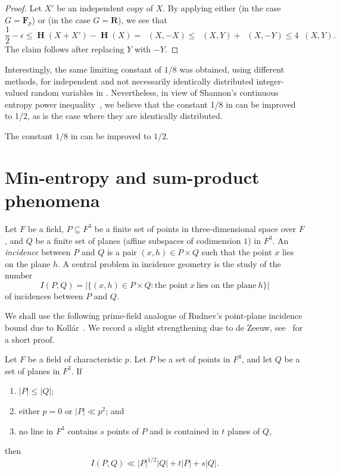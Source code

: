 \documentclass[twoside, 10pt]{article}
\newcommand\FF{{\mathbf{F}}}
\DeclareMathOperator{\Eta}{\mathbf{H}}
\DeclareMathOperator{\dR}{d_{\mathrm{R}}}
\newcommand{\RR}{\mathbf{R}}   %
\begin{document}
\begin{proof} Let $X'$ be an independent copy of $X$.
By applying either  (in the case $G=\FF_p$) or  (in the case $G=\RR$), we see that
\begin{equation} \label{triangleineqs}
\frac{1}{2} - \epsilon \leq \Eta(X+X') - \Eta(X) = \dR(X,-X) \leq \dR(X,Y) + \dR(X,-Y) \leq 4\dR(X,Y).
\end{equation}
The claim follows after replacing $Y$ with $-Y$.
\end{proof}

Interestingly, the same limiting constant of $1/8$ was obtained, using different methods, for independent and not necessarily identically distributed integer-valued random variables in \cite[Theorem 1]{hat}. Nevertheless, in view of Shannon's continuous entropy power 
inequality~\cite{shannon:48,stam:59}, we believe 
that the constant 1/8 in 
can be improved to 1/2, as is the case 
where they are identically distributed. 

\begin{conjecture}
The constant $1/8$ in  can be improved to $1/2$.
\end{conjecture}

\section{Min-entropy and sum-product phenomena}

Let $F$ be a field, $P\subseteq F^3$ be a finite set of points in 
three-dimensional space over $F$, and $Q$ be a finite set of planes 
(affine subspaces of codimension $1$) in $F^3$. An \textit{incidence} between $P$ and $Q$ is a pair $(x,h)\in P\times Q$ such that the point $x$ lies on the plane $h$. A central problem in incidence geometry is the study of the number
$$I(P,Q) = \big|\bigl\{ (x,h)\in P\times Q : \textrm{the point}\ x\ \textrm{lies on the plane}\ h\bigr\}\big|$$
of incidences between $P$ and $Q$.

We shall use the following prime-field analogue 
of Rudnev's point-plane incidence bound
due to Koll\'ar~\cite{kollar2015}.
We record a slight strengthening due to de Zeeuw, 
see~\cite{dezeeuw2016} for a short proof.

\begin{lemma}
\label{lempointplane} Let $F$ be a field of characteristic $p$.
Let $P$ be a set of points in $F^3$, and let $Q$ be a set of planes in $F^3$. If
\begin{enumerate}
\item $|P|\le |Q|$;
\item either $p=0$ or $|P|\ll p^2$; and
\item no line in $F^3$ contains $s$ points of $P$ and is contained in $t$ planes of $Q$,
\end{enumerate}
then
$$I(P,Q) \ll |P|^{1/2} |Q| + t|P| + s|Q|.$$
\end{lemma}
\end{document}
